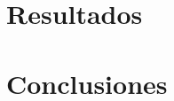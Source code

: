 \documentclass[12pt]{article}
\begin{document}
    \section{Resultados}


    \section{Conclusiones}

    \newpage
    
    
\end{document}

